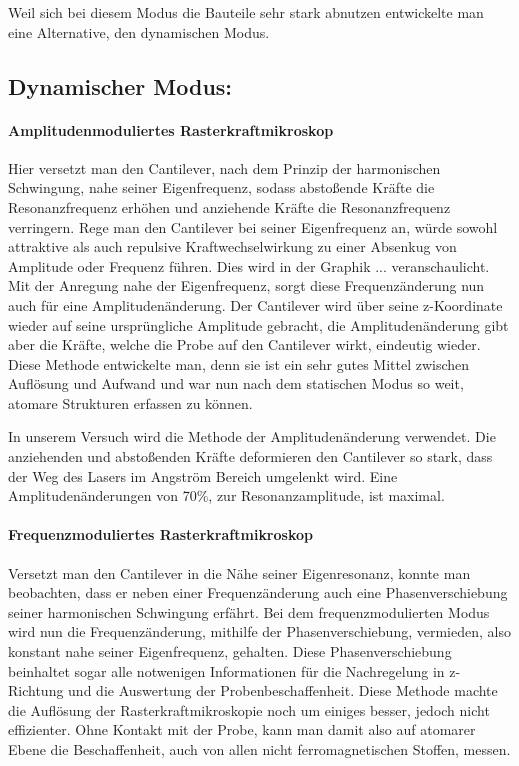 Weil sich bei diesem Modus die Bauteile sehr stark abnutzen entwickelte man eine Alternative, den dynamischen Modus.

\subsection{Dynamischer Modus:}

       \paragraph{Amplitudenmoduliertes Rasterkraftmikroskop}

Hier versetzt man den Cantilever, nach dem Prinzip der harmonischen Schwingung, nahe seiner Eigenfrequenz, sodass abstoßende Kräfte die Resonanzfrequenz erhöhen und anziehende Kräfte die Resonanzfrequenz verringern. 
Rege man den Cantilever bei seiner Eigenfrequenz an, würde sowohl attraktive als auch repulsive Kraftwechselwirkung zu einer Absenkug von Amplitude oder Frequenz führen. Dies wird in der Graphik ... veranschaulicht.
Mit der Anregung nahe der Eigenfrequenz, sorgt diese Frequenzänderung nun auch für eine Amplitudenänderung.
Der Cantilever wird über seine z-Koordinate wieder auf seine ursprüngliche Amplitude gebracht, die Amplitudenänderung gibt aber die Kräfte, welche die Probe auf den Cantilever wirkt, eindeutig wieder.
Diese Methode entwickelte man, denn sie ist ein sehr gutes Mittel zwischen Auflösung und Aufwand und war nun nach dem statischen Modus so weit, atomare Strukturen erfassen zu können.

 In unserem Versuch wird die Methode der Amplitudenänderung verwendet. 
Die anziehenden und abstoßenden Kräfte deformieren den Cantilever so stark, dass der Weg des Lasers im Angström Bereich umgelenkt wird. 
Eine Amplitudenänderungen von 70\%, zur Resonanzamplitude, ist maximal. 

       \paragraph{Frequenzmoduliertes Rasterkraftmikroskop}
       
Versetzt man den Cantilever in die Nähe seiner Eigenresonanz, konnte man beobachten, dass er neben einer Frequenzänderung auch eine Phasenverschiebung seiner harmonischen Schwingung erfährt.
Bei dem frequenzmodulierten Modus wird nun die Frequenzänderung, mithilfe der Phasenverschiebung, vermieden, also konstant nahe seiner Eigenfrequenz, gehalten.
Diese Phasenverschiebung beinhaltet sogar alle notwenigen Informationen für die Nachregelung in z-Richtung und die Auswertung der Probenbeschaffenheit.
Diese Methode machte die Auflösung der Rasterkraftmikroskopie noch um einiges besser, jedoch nicht effizienter.
Ohne Kontakt mit der Probe, kann man damit also auf atomarer Ebene die Beschaffenheit, auch von allen nicht ferromagnetischen Stoffen, messen.
 

